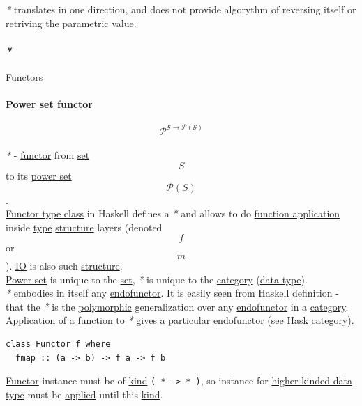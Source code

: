 \documentclass[11pt]{article}
\begin{document}
\emph{*} translates in one direction, and does not provide algorythm of reversing itself or retriving the parametric value.\\

\paragraph{\emph{*}}
\label{sec:orge45449d}

\label{org6c3c2a6}Functors\\

\paragraph{\label{org1844900}Power set functor}
\label{sec:org2c75798}
$$ \mathcal{P^{S \to P(S)}} $$\\

\emph{*} - \hyperref[org6073683]{functor} from \hyperref[orgbed80ba]{set} $$ S $$ to its \hyperref[org05c8b9e]{power set} $$ \mathcal{P}(S) $$.\\

\hyperref[org0e7b59c]{Functor type class} in Haskell defines a \emph{*} and allows to do \hyperref[org6ff03b0]{function application} inside \hyperref[org4fbaeb8]{type} \hyperref[org93ee82c]{structure} layers (denoted $$ f $$ or $$ m $$). \hyperref[org79ee7d8]{IO} is also such \hyperref[org93ee82c]{structure}.\\
\hyperref[org05c8b9e]{Power set} is unique to the \hyperref[orgbed80ba]{set}, \emph{*} is unique to the \hyperref[org3e3a79b]{category} (\hyperref[org965cde3]{data type}).\\
\emph{*} embodies in itself any \hyperref[org4dce7a1]{endofunctor}. It is easily seen from Haskell definition - that the \emph{*} is the \hyperref[org84d7fee]{polymorphic} generalization over any \hyperref[org4dce7a1]{endofunctor} in a \hyperref[org3e3a79b]{category}. \hyperref[orged2f814]{Application} of a \hyperref[orgeb5cddb]{function} to \emph{*} gives a particular \hyperref[org4dce7a1]{endofunctor} (see \hyperref[org79be162]{Hask} \hyperref[org3e3a79b]{category}).\\

\begin{verbatim}
class Functor f where
  fmap :: (a -> b) -> f a -> f b
\end{verbatim}

\hyperref[org6073683]{Functor} instance must be of \hyperref[org19ec4cb]{kind} \texttt{( * -> * )}, so instance for \hyperref[orgc6f7147]{higher-kinded data type} must be \hyperref[org848eb1f]{applied} until this \hyperref[org19ec4cb]{kind}.\\
\end{document}

